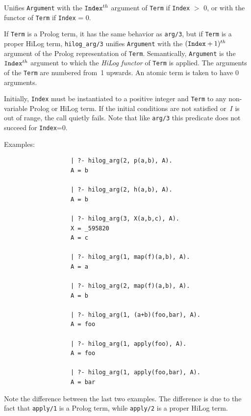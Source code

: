 \begin{description}
    Unifies {\tt Argument} with the ${\tt Index}^{th}$ argument of {\tt Term}
    if {\tt Index} $>$ 0, or with the functor of {\tt Term} if {\tt Index} = 0.

    If {\tt Term} is a Prolog term, it has the same behavior as {\tt arg/3},
    but if {\tt Term} is a proper HiLog term, {\tt hilog\_arg/3} unifies 
    {\tt Argument} with the 
    $({\tt Index}+1)^{th}$ argument of the Prolog representation of 
    {\tt Term}\@.  Semantically, {\tt Argument} is the ${\tt Index}^{th}$ 
    argument to which the {\em HiLog functor} of {\tt Term} is applied.
    The arguments of the {\tt Term} are numbered from~1 upwards. An atomic term 
    is taken to have $0$ arguments.  
    
    Initially, {\tt Index} must be instantiated to a positive integer and 
    {\tt Term} to any non-variable Prolog or HiLog term.
    If the initial conditions are not satisfied or~$I$ is 
    out of range, the call quietly fails. Note that like {\tt arg/3}
    this predicate does not succeed for {\tt Index}=0.

    Examples:
    {\footnotesize
     \begin{verbatim}
                   | ?- hilog_arg(2, p(a,b), A).
                   A = b

                   | ?- hilog_arg(2, h(a,b), A).
                   A = b

                   | ?- hilog_arg(3, X(a,b,c), A).
                   X = _595820
                   A = c

                   | ?- hilog_arg(1, map(f)(a,b), A).
                   A = a

                   | ?- hilog_arg(2, map(f)(a,b), A).
                   A = b

                   | ?- hilog_arg(1, (a+b)(foo,bar), A).
                   A = foo

                   | ?- hilog_arg(1, apply(foo), A). 
                   A = foo

                   | ?- hilog_arg(1, apply(foo,bar), A).
                   A = bar
     \end{verbatim}}

    Note the difference between the last two examples. The difference is 
    due to the fact that {\tt apply/1} is a Prolog term, while 
    {\tt apply/2} is a proper HiLog term.


\end{description}
